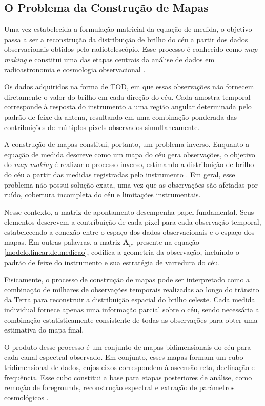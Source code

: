 \subsection{O Problema da Construção de Mapas}

Uma vez estabelecida a formulação matricial da equação de medida, o objetivo passa a ser a reconstrução da distribuição de brilho do céu a partir dos dados observacionais obtidos pelo radiotelescópio. Esse processo é conhecido como \textit{map-making} e constitui uma das etapas centrais da análise de dados em radioastronomia e cosmologia observacional \cite{tegmark1997mapmaking}.

Os dados adquiridos na forma de TOD, em que essas observações não fornecem diretamente o valor do brilho em cada direção do céu. Cada amostra temporal corresponde à resposta do instrumento a uma região angular determinada pelo padrão de feixe da antena, resultando em uma combinação ponderada das contribuições de múltiplos pixels observados simultaneamente.

A construção de mapas constitui, portanto, um problema inverso. Enquanto a equação de medida descreve como um mapa do céu gera observações, o objetivo do \textit{map-making} é realizar o processo inverso, estimando a distribuição de brilho do céu a partir das medidas registradas pelo instrumento \cite{tegmark1997mapmaking}. Em geral, esse problema não possui solução exata, uma vez que as observações são afetadas por ruído, cobertura incompleta do céu e limitações instrumentais.

Nesse contexto, a matriz de apontamento desempenha papel fundamental. Seus elementos descrevem a contribuição de cada pixel para cada observação temporal, estabelecendo a conexão entre o espaço dos dados observacionais e o espaço dos mapas. Em outras palavras, a matriz $\mathbf A_\nu$, presente na equação \eqref{modelo.linear.de.medicao}, codifica a geometria da observação, incluindo o padrão de feixe do instrumento e sua estratégia de varredura do céu.

Fisicamente, o processo de construção de mapas pode ser interpretado como a combinação de milhares de observações temporais realizadas ao longo do trânsito da Terra para reconstruir a distribuição espacial do brilho celeste. Cada medida individual fornece apenas uma informação parcial sobre o céu, sendo necessária a combinação estatisticamente consistente de todas as observações para obter uma estimativa do mapa final.

O produto desse processo é um conjunto de mapas bidimensionais do céu para cada canal espectral observado. Em conjunto, esses mapas formam um cubo tridimensional de dados, cujos eixos correspondem à ascensão reta, declinação e frequência. Esse cubo constitui a base para etapas posteriores de análise, como remoção de foregrounds, reconstrução espectral e extração de parâmetros cosmológicos \cite{wilson2013tools}.

